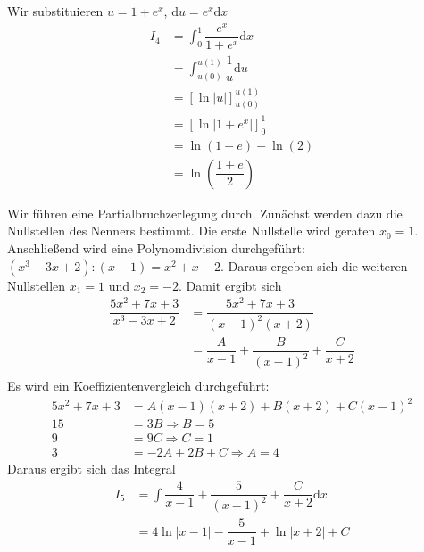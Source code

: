 {\begin{iii}
\item  Wir substituieren $u=1+e^x$, $\mathrm{d} u = e^x \mathrm{d} x$
\begin{align*}
I_4 &= \int_0^1 \dfrac{e^x}{1+e^x}\mathrm{d} x \\
&=\int_{u(0)}^{u(1)} \dfrac{1}{u} \mathrm{d} u \\
&= \left[ \ln|u|\right]_{u(0)}^{u(1)} \\
&=  \left[ \ln|1+e^x|\right]_0^1 \\
&= \ln(1+e) - \ln(2) \\
&= \ln \left( \dfrac{1+e}{2}\right) 
\end{align*}

\item Wir f\"uhren eine Partialbruchzerlegung durch. Zun\"achst werden dazu die Nullstellen des Nenners bestimmt. Die erste Nullstelle wird geraten $x_0 =1$. Anschließend wird eine Polynomdivision durchgef\"uhrt:
$(x^3-3x+2):(x-1)=x^2+x-2$. Daraus ergeben sich die weiteren Nullstellen $x_1 = 1$ und $x_2 =-2$. Damit ergibt sich
\begin{align*}
 \dfrac{5x^2+7x+3}{x^3-3x+2} &=  \dfrac{5x^2+7x+3}{(x-1)^2(x+2)}  \\
 &= \dfrac{A}{x-1} + \dfrac{B}{(x-1)^2} + \dfrac{C}{x+2} \\
\end{align*}
Es wird ein Koeffizientenvergleich durchgef\"uhrt:
\begin{align*}
5x^2+7x+3 &= A(x-1)(x+2) +B(x+2)+C(x-1)^2 \\
15 &= 3B \Rightarrow B=5 \\
9 &= 9C \Rightarrow C =1 \\
3 &= -2A+2B+C \Rightarrow A =4
\end{align*}
Daraus ergibt sich das Integral
\begin{align*}
I_5 &= \int \dfrac{4}{x-1} + \dfrac{5}{(x-1)^2} + \dfrac{C}{x+2}  \mathrm{d} x \\
&= 4 \ln|x-1| - \dfrac{5}{x-1} + \ln|x+2| + C
\end{align*}
\end{iii}
}


